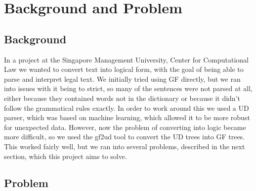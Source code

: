 \chapter{Background and Problem}




% 

\section{Background}\label{sect:background}

In a project\cite{listenmaa-etal-2021-towards} at the Singapore Management University, Center for Computational Law we wanted to convert text into logical form, with the goal of being able to parse and interpret legal text. We initially tried using GF directly, but we ran into issues with it being to strict, so many of the sentences were not parsed at all, either because they contained words not in the dictionary or because it didn't follow the grammatical rules exactly. In order to work around this we used a UD parser, which was based on machine learning, which allowed it to be more robust for unexpected data. However, now the problem of converting into logic became more difficult, so we used the gf2ud tool to convert the UD trees into GF trees. This worked fairly well, but we ran into several problems, described in the next section, which this project aims to solve.

\section{Problem}



